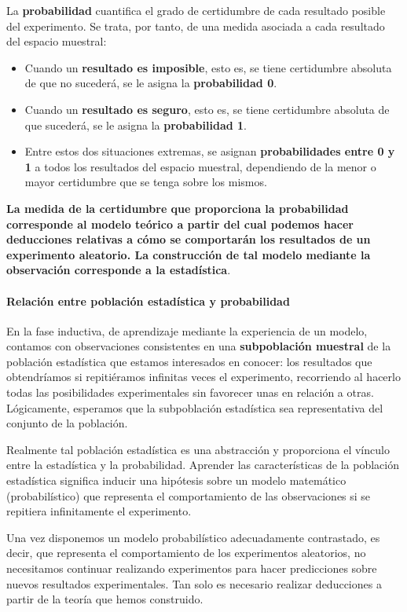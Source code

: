 \documentclass[11pt]{article}
\begin{document}
    La \textbf{probabilidad} cuantifica el grado de certidumbre de cada
resultado posible del experimento. Se trata, por tanto, de una medida
asociada a cada resultado del espacio muestral: 
\begin{itemize}
\item Cuando un
\textbf{resultado es imposible}, esto es, se tiene certidumbre absoluta
de que no sucederá, se le asigna la \textbf{probabilidad 0}. 
\item Cuando un
\textbf{resultado es seguro}, esto es, se tiene certidumbre absoluta de
que sucederá, se le asigna la \textbf{probabilidad 1}. 
\item Entre estos dos
situaciones extremas, se asignan \textbf{probabilidades entre 0 y 1} a
todos los resultados del espacio muestral, dependiendo de la menor o
mayor certidumbre que se tenga sobre los mismos.
\end{itemize}

\textbf{La medida de la certidumbre que proporciona la probabilidad
corresponde al modelo teórico a partir del cual podemos hacer
deducciones relativas a cómo se comportarán los resultados de un
experimento aleatorio. La construcción de tal modelo mediante la
observación corresponde a la estadística}.

    \paragraph{Relación entre población estadística y
probabilidad}\label{relaciuxf3n-entre-poblaciuxf3n-estaduxedstica-y-probabilidad}

En la fase inductiva, de aprendizaje mediante la experiencia de un
modelo, contamos con observaciones consistentes en una
\textbf{subpoblación muestral} de la población estadística que estamos
interesados en conocer: los resultados que obtendríamos si repitiéramos
infinitas veces el experimento, recorriendo al hacerlo todas las
posibilidades experimentales sin favorecer unas en relación a otras.
Lógicamente, esperamos que la subpoblación estadística sea
representativa del conjunto de la población.

Realmente tal población estadística es una abstracción y proporciona el
vínculo entre la estadística y la probabilidad. Aprender las
características de la población estadística significa inducir una
hipótesis sobre un modelo matemático (probabilístico) que representa el
comportamiento de las observaciones si se repitiera infinitamente el
experimento.

Una vez disponemos un modelo probabilístico adecuadamente contrastado, es
decir, que representa el comportamiento de los experimentos aleatorios,
no necesitamos continuar realizando experimentos para hacer predicciones
sobre nuevos resultados experimentales. Tan solo es necesario realizar
deducciones a partir de la teoría que hemos construido.
\end{document}
